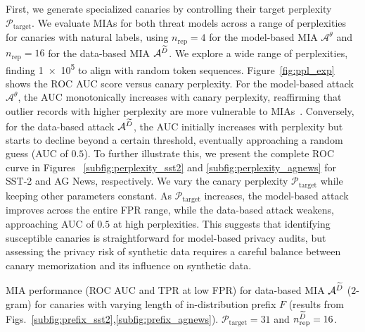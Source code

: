 First, we generate specialized canaries by controlling their target perplexity $\mathcal{P}_\textrm{target}$.
We evaluate MIAs for both threat models across a range of perplexities for canaries with natural labels, using $n_\textrm{rep}=4$ for the model-based MIA $\mathcal{A}^\theta$ and $n_\textrm{rep}=16$ for the data-based MIA $\mathcal{A}^{\widetilde{D}}$.
%
We explore a wide range of perplexities, finding \num{1e5} to align with random token sequences.
Figure~\ref{fig:ppl_exp} shows the ROC AUC score versus canary perplexity.
For the model-based attack $\mathcal{A}^\theta$, the AUC monotonically increases with canary perplexity, reaffirming that outlier records with higher perplexity are more vulnerable to MIAs~\citep{feldman2020neural,carlini2022membership,meeuscopyright}.
Conversely, for the data-based attack $\mathcal{A}^{\widetilde{D}}$, the AUC initially increases with perplexity but starts to decline beyond a certain threshold, eventually approaching a random guess (AUC of $0.5$). To further illustrate this, we present the complete ROC curve in Figures ~\ref{subfig:perplexity_sst2} and \ref{subfig:perplexity_agnews} for SST-2 and AG News, respectively.
We vary the canary perplexity $\mathcal{P}_\textrm{target}$ while keeping other parameters constant.
As $\mathcal{P}_\textrm{target}$ increases, the model-based attack improves across the entire FPR range, while the data-based attack weakens, approaching AUC of $0.5$ at high perplexities.
This suggests that identifying susceptible canaries is straightforward for model-based privacy audits, but assessing the privacy risk of synthetic data requires a careful balance between canary memorization and its influence on synthetic data.

\begin{table}[t!]
    \centering
    \footnotesize
    
    \caption{MIA performance (ROC AUC and TPR at low FPR) for data-based MIA $\mathcal{A}^{\widetilde{D}}$ ($2$-gram) for canaries with varying length of in-distribution prefix $F$ (results from Figs.~\ref{subfig:prefix_sst2},\ref{subfig:prefix_agnews}). $\mathcal{P}_\textrm{target}=31$ and $n_\textrm{rep}^{{\widetilde{D}}}=16$.}
    \label{tab:prefix_tpr}
\end{table}

